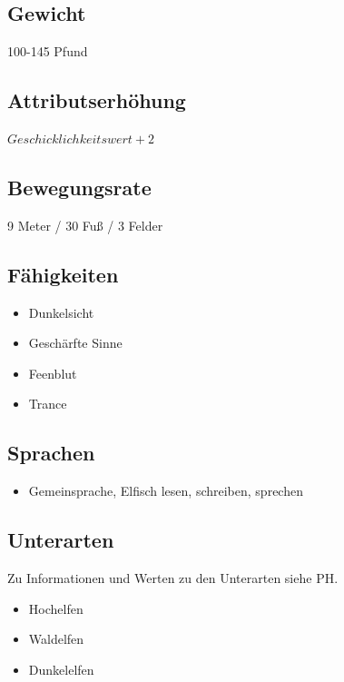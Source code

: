 \subsection*{Gewicht}
100-145 Pfund

\subsection*{Attributserhöhung}
$Geschicklichkeitswert + 2$

\subsection*{Bewegungsrate}
9 Meter / 30 Fuß / 3 Felder

\subsection*{Fähigkeiten}
\begin{itemize}
	\item Dunkelsicht
	\item Geschärfte Sinne
	\item Feenblut
	\item Trance
\end{itemize}

\subsection*{Sprachen}
\begin{itemize}
	\item Gemeinsprache, Elfisch
	\subitem lesen, schreiben, sprechen
\end{itemize}

\subsection*{Unterarten}
Zu Informationen und Werten zu den Unterarten siehe PH.
\begin{itemize}
	\item Hochelfen
	\item Waldelfen
	\item Dunkelelfen
\end{itemize}

